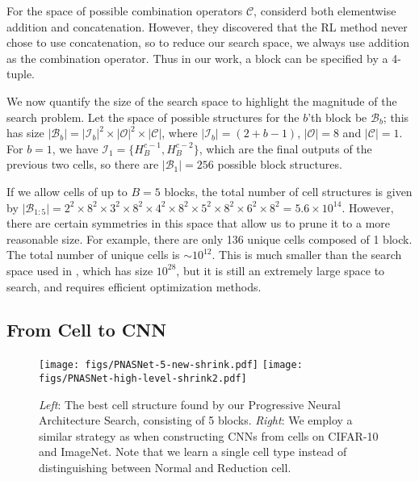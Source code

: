 \documentclass[runningheads]{llncs}
\begin{document}
For the space of possible combination operators $\mathcal{C}$,
 \cite{DBLP:journals/corr/ZophVSL17} considerd both
 elementwise addition and concatenation.
However, they discovered that the RL method never chose to use concatenation,
so to reduce our search space, we always use addition as the combination operator.
Thus in our work, a block can be specified by a 4-tuple.


We now quantify the size of the search space to highlight the magnitude of the search problem. 
Let the space of possible structures for the $b$'th block
be $\mathcal{B}_b$;
this has size
$|\mathcal{B}_b|= |\mathcal{I}_b|^2 \times |\mathcal{O}|^2 \times |\mathcal{C}|$,
where 
$|\mathcal{I}_b|=(2+b-1)$,
$|\mathcal{O}|=8$ and $|\mathcal{C}|=1$.
For $b=1$, we have 
$\mathcal{I}_1 = \{H_B^{c-1}, H_B^{c-2}\}$,
which 
are the final outputs of the previous two cells,
so there are $|\mathcal{B}_1|=256$ possible block structures. 


If we allow cells of up to $B=5$ blocks,
the total number of cell structures
is given by
$|\mathcal{B}_{1:5}| = 2^2 \times 8^2 \times 3^2 \times 8^2 \times 4^2 \times 8^2 \times 5^2 \times 8^2 \times 6^2 \times 8^2 = 5.6 \times 10^{14}$. 
However, there are certain symmetries in this space that allow us to prune it
to a more reasonable size.
For example, there are only 136 unique cells composed of 1 block.
The total number of unique cells is $\sim 10^{12}$.
This is much smaller than the search space used in 
 \cite{DBLP:journals/corr/ZophVSL17}, which has size
 $10^{28}$,
but it is still an extremely large space to search, and requires efficient 
optimization methods.

\subsection{From Cell to CNN}\begin{figure}[t]
\centering
\texttt{[image: figs/PNASNet-5-new-shrink.pdf]}
\qquad
\texttt{[image: figs/PNASNet-high-level-shrink2.pdf]}
\caption{
\emph{Left}: 
The best cell structure found by our Progressive Neural Architecture Search, consisting of 5 blocks.
\emph{Right}:
We employ a similar strategy as \cite{DBLP:journals/corr/ZophVSL17} when constructing CNNs from cells on CIFAR-10 and ImageNet. 
Note that we learn a single cell type instead of distinguishing between Normal and Reduction cell.
}
\label{fig:network}
\end{figure}
\end{document}
